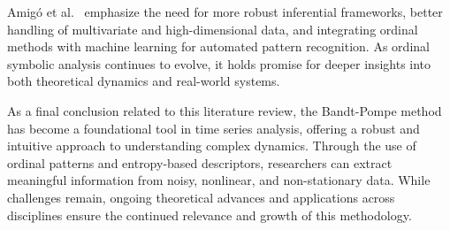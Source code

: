 Amigó et al.~\cite{amigo2023ordinal} emphasize the need for more robust inferential frameworks, better handling of multivariate and high-dimensional data, and integrating ordinal methods with machine learning for automated pattern recognition. As ordinal symbolic analysis continues to evolve, it holds promise for deeper insights into both theoretical dynamics and real-world systems.

As a final conclusion related to this literature review, the Bandt-Pompe method has become a foundational tool in time series analysis, offering a robust and intuitive approach to understanding complex dynamics. Through the use of ordinal patterns and entropy-based descriptors, researchers can extract meaningful information from noisy, nonlinear, and non-stationary data. While challenges remain, ongoing theoretical advances and applications across disciplines ensure the continued relevance and growth of this methodology.





